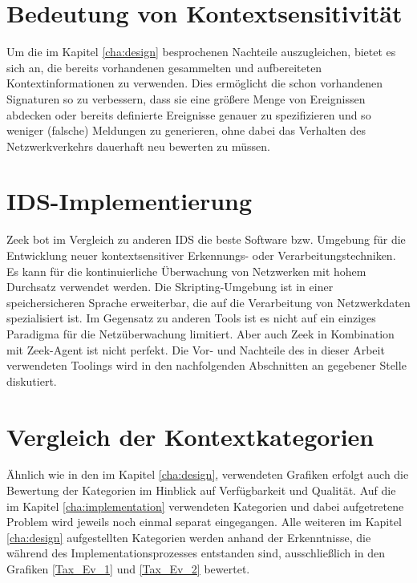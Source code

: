 \section{Bedeutung von Kontextsensitivität}
Um die im Kapitel \ref{cha:design} besprochenen Nachteile auszugleichen, bietet es sich an, die bereits vorhandenen gesammelten und aufbereiteten Kontextinformationen zu verwenden. Dies ermöglicht die schon vorhandenen Signaturen so zu verbessern, dass sie eine größere Menge von Ereignissen abdecken oder bereits definierte Ereignisse genauer zu spezifizieren und so weniger (falsche) Meldungen zu generieren, ohne dabei das Verhalten des Netzwerkverkehrs dauerhaft neu bewerten zu müssen.
\section{IDS-Implementierung}
Zeek bot im Vergleich zu anderen IDS die beste Software bzw. Umgebung für die Entwicklung neuer kontextsensitiver Erkennungs- oder Verarbeitungstechniken. Es kann für die kontinuierliche Überwachung von Netzwerken mit hohem Durchsatz verwendet werden. Die Skripting-Umgebung ist in einer speichersicheren Sprache erweiterbar, die auf die Verarbeitung von Netzwerkdaten spezialisiert ist. Im Gegensatz zu anderen Tools ist es nicht auf ein einziges Paradigma für die Netzüberwachung limitiert.
Aber auch Zeek in Kombination mit Zeek-Agent ist nicht perfekt. Die Vor- und Nachteile des in dieser Arbeit verwendeten Toolings wird in den nachfolgenden Abschnitten an gegebener Stelle diskutiert.
\section{Vergleich der Kontextkategorien} 
Ähnlich wie in den im Kapitel \ref{cha:design}, verwendeten Grafiken erfolgt auch die Bewertung der Kategorien im Hinblick auf Verfügbarkeit und Qualität. Auf die im Kapitel \ref{cha:implementation} verwendeten Kategorien und dabei aufgetretene Problem wird jeweils noch einmal separat eingegangen. Alle weiteren im Kapitel \ref{cha:design} aufgestellten Kategorien werden anhand der Erkenntnisse, die während des Implementationsprozesses entstanden sind, ausschließlich in den Grafiken \ref{Tax_Ev_1} und \ref{Tax_Ev_2} bewertet.

